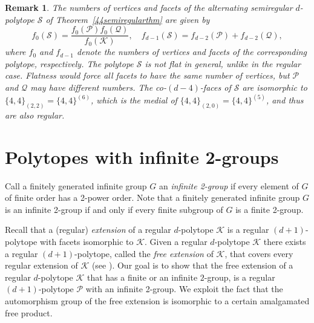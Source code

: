 \documentclass[12pt]{amsart}
\newtheorem{remark}[theorem]{Remark}
\theoremstyle{definition}
\begin{document}
\begin{remark}
The numbers of vertices and facets of the alternating semiregular $d$-polytope $\mathcal S$ of Theorem~\ref{44semiregularthm} are given by
\[ f_{0}(\mathcal{S}) = \frac{f_{0}(\mathcal{P})f_{0}(\mathcal{Q})}{f_{0}(\mathcal{K})},\;\;\;\, 
f_{d-1}(\mathcal{S}) = f_{d-2}(\mathcal{P})+f_{d-2}(\mathcal{Q}) ,\]
where $f_0$ and $f_{d-1}$ denote the numbers of vertices and facets of the corresponding polytope, respectively. The polytope $\mathcal S$ is not flat in general, unlike in the regular case. Flatness would force all facets to have the same number of vertices, but $\mathcal{P}$ and $\mathcal Q$ may have different numbers. The co-$(d-4)$-faces of $\mathcal{S}$ are isomorphic to $\{4,4\}_{(2,2)}=\{4,4\}^{(6)}$, which is the medial of $\{4,4\}_{(2,0)}=\{4,4\}^{(5)}$, and thus are also regular. 
\end{remark}

\section{Polytopes with infinite 2-groups}
\label{inf2group}

Call a finitely generated infinite group $G$ an {\em infinite 2-group} if every element of $G$ of finite order has a 2-power order. Note that a finitely generated infinite group $G$ is an infinite 2-group if and only if every finite subgroup of $G$ is a finite 2-group. 

Recall that a (regular) {\em extension\/} of a regular $d$-polytope $\mathcal K$ is a regular $(d+1)$-polytope with facets isomorphic to $\mathcal K$. Given a regular $d$-polytope $\mathcal K$ there exists a regular $(d+1)$-polytope, called the {\em free extension} of $\mathcal{K}$, that covers every regular extension of $\mathcal K$ (see \cite[4D4]{McMSch2002}). Our goal is to show that the free extension of a regular $d$-polytope $\mathcal{K}$ that has a finite or an infinite $2$-group, is a regular $(d+1)$-polytope $\mathcal P$ with an infinite 2-group. We exploit the fact that the automorphism group of the free extension is isomorphic to a certain amalgamated free product. 
\end{document}
